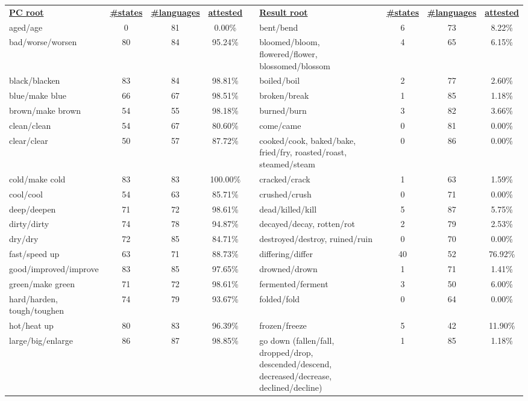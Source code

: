 \begin{tabular}{p{3cm}ccccp{3cm}ccc}
\underline{\textbf{PC root}} & \underline{\textbf{\#states}} & \underline{\textbf{\#languages}} & \underline{\textbf{attested}} & & \underline{\textbf{Result root}} & \underline{\textbf{\#states}} & \underline{\textbf{\#languages}} & \underline{\textbf{attested}} \\
aged/age & 0 & 81 & 0.00\% & & bent/bend & 6 & 73 & 8.22\% \\
bad/worse/worsen & 80 & 84 & 95.24\% & & bloomed/bloom, flowered/flower, blossomed/blossom & 4 & 65 & 6.15\% \\
black/blacken & 83 & 84 & 98.81\% & & boiled/boil & 2 & 77 & 2.60\% \\
blue/make blue & 66 & 67 & 98.51\% & & broken/break & 1 & 85 & 1.18\% \\
brown/make brown & 54 & 55 & 98.18\% & & burned/burn & 3 & 82 & 3.66\% \\
clean/clean & 54 & 67 & 80.60\% & & come/came & 0 & 81 & 0.00\% \\
clear/clear & 50 & 57 & 87.72\% & & cooked/cook, baked/bake, fried/fry, roasted/roast, steamed/steam & 0 & 86 & 0.00\% \\
cold/make cold & 83 & 83 & 100.00\% & & cracked/crack & 1 & 63 & 1.59\% \\
cool/cool & 54 & 63 & 85.71\% & & crushed/crush & 0 & 71 & 0.00\% \\
deep/deepen & 71 & 72 & 98.61\% & & dead/killed/kill & 5 & 87 & 5.75\% \\
dirty/dirty & 74 & 78 & 94.87\% & & decayed/decay, rotten/rot & 2 & 79 & 2.53\% \\
dry/dry & 72 & 85 & 84.71\% & & destroyed/destroy, ruined/ruin & 0 & 70 & 0.00\% \\
fast/speed up & 63 & 71 & 88.73\% & & differing/differ & 40 & 52 & 76.92\% \\
good/improved/improve & 83 & 85 & 97.65\% & & drowned/drown & 1 & 71 & 1.41\% \\
green/make green & 71 & 72 & 98.61\% & & fermented/ferment & 3 & 50 & 6.00\% \\
hard/harden, tough/toughen & 74 & 79 & 93.67\% & & folded/fold & 0 & 64 & 0.00\% \\
hot/heat up & 80 & 83 & 96.39\% & & frozen/freeze & 5 & 42 & 11.90\% \\
large/big/enlarge & 86 & 87 & 98.85\% & & go down (fallen/fall, dropped/drop, descended/descend, decreased/decrease, declined/decline) & 1 & 85 & 1.18\% \\

\end{tabular}
